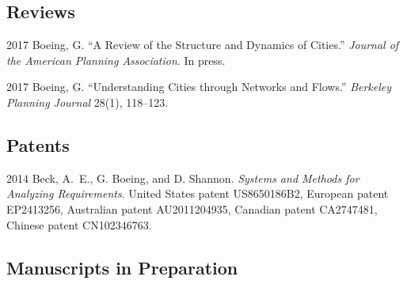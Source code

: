 \documentclass{academiccv}
\begin{document}
\subsection*{Reviews}

\begin{tablist}
	
	\item[2017] \tab Boeing, G. \enquote{A Review of the Structure and Dynamics of Cities.} \emph{Journal of the American Planning Association}. In press.
	
	\item[2017] \tab Boeing, G. \enquote{Understanding Cities through Networks and Flows.} \emph{Berkeley Planning Journal} 28(1), 118--123.
	
\end{tablist}



\subsection*{Patents}

\begin{tablist}

\item[2014] \tab Beck, A.~E., G. Boeing, and D. Shannon. \emph{Systems and Methods for Analyzing Requirements}. United States patent US8650186B2, European patent EP2413256, Australian patent AU2011204935, Canadian patent CA2747481, Chinese patent CN102346763.

\end{tablist}



\subsection*{Manuscripts in Preparation}
\end{document}
